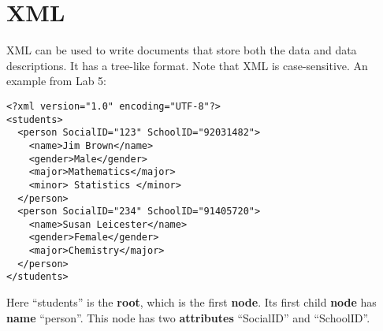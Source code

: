 \documentclass[12pt]{article}\usepackage[]{graphicx}\usepackage[]{color}
\begin{document}
\section{XML}
XML can be used to write documents that store both the data and data descriptions. It has a tree-like format. Note that XML is case-sensitive. An example from Lab 5:
\begin{verbatim}
<?xml version="1.0" encoding="UTF-8"?>
<students>
  <person SocialID="123" SchoolID="92031482">
    <name>Jim Brown</name>
    <gender>Male</gender>
    <major>Mathematics</major>
    <minor> Statistics </minor>
  </person>
  <person SocialID="234" SchoolID="91405720">
    <name>Susan Leicester</name>
    <gender>Female</gender>
    <major>Chemistry</major>
  </person>
</students>
\end{verbatim}
Here ``students'' is the \textbf{root}, which is the first \textbf{node}. Its first child \textbf{node} has \textbf{name} ``person''. This node has two \textbf{attributes} ``SocialID'' and ``SchoolID''.
\end{document}
